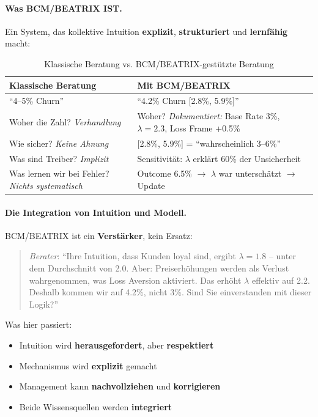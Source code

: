 \paragraph{Was BCM/BEATRIX IST.}
Ein System, das kollektive Intuition \textbf{explizit}, \textbf{strukturiert} und \textbf{lernfähig} macht:

\begin{table}[h]
\centering
\caption{Klassische Beratung vs. BCM/BEATRIX-gestützte Beratung}
\begin{tabular}{@{}p{6.5cm}p{6.5cm}@{}}
\toprule
\textbf{Klassische Beratung} & \textbf{Mit BCM/BEATRIX} \\
\midrule
``4--5\% Churn'' & ``4.2\% Churn [2.8\%, 5.9\%]'' \\[0.3em]
Woher die Zahl? \textit{Verhandlung} & Woher? \textit{Dokumentiert:} Base Rate 3\%, $\lambda = 2.3$, Loss Frame +0.5\% \\[0.3em]
Wie sicher? \textit{Keine Ahnung} & [2.8\%, 5.9\%] = ``wahrscheinlich 3--6\%'' \\[0.3em]
Was sind Treiber? \textit{Implizit} & Sensitivität: $\lambda$ erklärt 60\% der Unsicherheit \\[0.3em]
Was lernen wir bei Fehler? \textit{Nichts systematisch} & Outcome 6.5\% $\rightarrow$ $\lambda$ war unterschätzt $\rightarrow$ Update \\
\bottomrule
\end{tabular}
\end{table}

\paragraph{Die Integration von Intuition und Modell.}
BCM/BEATRIX ist ein \textbf{Verstärker}, kein Ersatz:

\begin{quote}
\textit{Berater}: ``Ihre Intuition, dass Kunden loyal sind, ergibt $\lambda = 1.8$ -- unter dem Durchschnitt von 2.0. Aber: Preiserhöhungen werden als Verlust wahrgenommen, was Loss Aversion aktiviert. Das erhöht $\lambda$ effektiv auf 2.2. Deshalb kommen wir auf 4.2\%, nicht 3\%. Sind Sie einverstanden mit dieser Logik?''
\end{quote}

Was hier passiert:
\begin{itemize}
    \item Intuition wird \textbf{herausgefordert}, aber \textbf{respektiert}
    \item Mechanismus wird \textbf{explizit} gemacht
    \item Management kann \textbf{nachvollziehen} und \textbf{korrigieren}
    \item Beide Wissensquellen werden \textbf{integriert}
\end{itemize}

